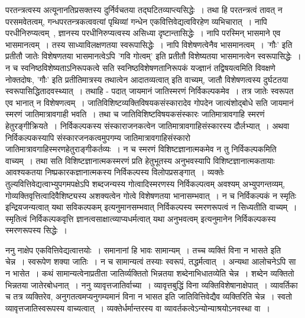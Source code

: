 				परतन्त्रत्वस्य अत्यूनानतिप्रसक्तस्य दुर्निर्वचतया तद्घटितव्याप्त्यसिद्धेः~। तथा हि परतन्त्रत्वं तावत् न परसमवेतत्वम्, गन्धपरतन्त्रकत्ववत्यां पृथिव्यां गन्धेन एकवित्तिवेद्यत्वविरहेण व्यभिचारात्~। नापि परधीनिरुप्यत्वम्~, ज्ञानस्य परधीनिरुप्यत्वस्य असिध्या दृष्टान्तासिद्धेः~। नापि परस्मिन् भासमाने एव भासमानत्वम्~। तस्य साध्याविलक्षणतया स्वरूपासिद्धेः~। नापि विशेषणत्वेनैव भासमानत्वम्~। 'गौः' इति प्रतीतौ जातेः विशेषणतया भासमानत्वेऽपि 'गवि गोत्वम्' इति प्रतीतौ विशेष्यतया भासमानत्वेन स्वरूपासिद्धेः~। न च स्वनिष्ठविशेष्यताऽनिरूपकत्वे सति स्वनिष्ठविशेषणतानिरूपकं यज्ज्ञानं तद्विषयत्वमिति विवक्षणे नोक्तदोषः, 'गौः' इति प्रतीतिमात्रस्य तथात्वेन आदातव्यत्वात् इति वाच्यम्, जातौ विशेषणत्वस्य दुर्घटतया स्वरूपासिद्धितादवस्थ्यात्~। तथाहि - पदात् जायमानं जातिस्मरणं निर्विकल्पकमेव~। तत्र जातेः स्वरूपत एव भानात् न विशेषणत्वम्~। जातिविशिष्टव्यक्तिविषयकसंस्कारादेव गोपदेन जात्यंशोद्बोधे सति जायमानं स्मरणं जातिमात्रावगाही भवति~। तथा च जातिविशिष्टविषयकसंस्कारः जातिमात्रावगाहि स्मरणं हेतुरङ्गीक्रियते~। निर्विकल्पकस्य संस्काराजनकत्वेन जातिमात्रावगाहिसंस्कारस्य दौर्लभ्यात्~। अथवा निर्विकल्पकस्यापि संस्कारजनकत्वमुपगम्य जातिमात्रावगाहिसंस्कारो जातिमात्रावगाहिस्मरणहेतुराङ्गीकर्तव्यः~। न च स्मरणं विशिष्टज्ञानात्मकमेव न तु निर्विकल्पकमिति वाच्यम्~। तथा सति विशिष्टज्ञानात्मकस्मरणं प्रति हेतुभूतस्य अनुभवस्यापि विशिष्टज्ञानात्मकतायाः आवश्यकतया निष्प्रकारकज्ञानात्मकस्य निर्विकल्पस्य विलोपप्रसङ्गात्~। व्यक्तेः तुल्यवित्तिवेद्यत्वाभ्युपगमपक्षेऽपि शब्दजन्यस्य गोत्वादिस्मरणस्य निर्विकल्पत्वम् अवश्यम् अभ्युपगन्तव्यम्, गोव्यक्तिवृत्तित्वादिवैशिष्ट्यस्य अशक्यत्वेन गोत्वे विशेषणतया भानासम्भवात्~। न च निर्विकल्पकं न स्मृतिः इन्द्रियजन्यत्वात् यथा सविकल्पकम् इत्यनुमानसम्भवात् निर्विकल्पस्य स्मरणरूपत्वं न सिध्यतीति वाच्यम्~। स्मृतित्वं निर्विकल्पकवृत्ति ज्ञानत्वसाक्षात्व्याप्यधर्मत्वात् यथा अनुभवत्वम् इत्यनुमानेन निर्विकल्पकस्य स्मरणरूपस्य सिद्धेः~।

				\begin{small}

					ननु नाक्षेप एकवित्तिवेद्यत्वात्तयोः~। समानानां हि भावः सामान्यम्~। तच्च व्यक्तिं विना न भासते इति चेन्न~। स्वरूपेण शक्या जातिः~। न च सामान्यत्वं तस्याः स्वरूपं, तद्धर्मत्वात्~। अन्यथा आलोचनेऽपि सा न भासेत~। कथं सामान्यत्वेनाप्रतीता जातिर्व्यक्तितो भिन्नतया शब्देनाभिधातव्येति चेन्न~। शब्देन व्यक्तितो भिन्नतया जातेरबोधनात्~। ननु व्यावृत्तजातिर्वाच्या~। व्यावृत्तबुद्धिं विना व्यक्तिविशेषानाक्षेपात्~। व्यावर्तिका च तत्र व्यक्तिरेव, अनुगतत्वमप्यनुगम्यमानं विना न भासत इति जातिवित्तिवेद्यैव व्यक्तिरिति चेन्न~। स्वतो व्यावृत्तजातिस्वरूपस्य वाच्यत्वात्~। व्यक्तेर्धर्मान्तरस्य वा व्यावर्तकत्वेऽन्योन्याश्रयोऽनवस्था वा~।
				\end{small}


